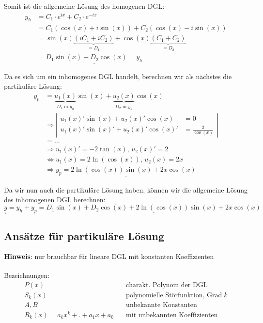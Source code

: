 Somit ist die allgemeine Lösung des homogenen DGL:
\begin{align*}
y_h &= C_1 \cdot e^{ix} + C_2 \cdot e^{-ix}\\
&= C_1 (\cos(x) + i\sin(x)) + C_2(\cos(x) - i\sin(x))\\
&= \sin(x) \underbrace{(i C_1 + i C_2)}_{ = D_1} + \cos(x) \underbrace{(C_1 + C_2)}_{= D_2}\\
&= \underline{D_1 \sin(x) + D_2 \cos(x) = y_h}
\end{align*}

Da es sich um ein inhomogenes DGL handelt, berechnen wir als nächstes die partikuläre
Lösung:
\begin{align*}
y_p &= \underbrace{u_1(x)}_{D_1 \text{ in } y_h} \sin(x) + \underbrace{u_2(x)}_{D_2 \text{ in } y_h} \cos(x)\\
&\Rightarrow \left|
	\begin{aligned}
		u_1(x)' \sin(x) + u_2(x)' \cos(x) &= 0\\
		u_1(x)' \sin(x)' + u_2(x)' \cos(x)' &= \frac{2}{\cos(x)}
	\end{aligned}
\right|\\
&= \ldots\\
&\Rightarrow u_1(x)' = -2 \tan(x),\, u_2(x)' = 2\\
&\Leftrightarrow u_1(x) = 2 \ln(\cos(x)),\, u_2(x) = 2x\\
&\Rightarrow \underline{y_p = 2 \ln(\cos(x)) \sin(x) + 2x \cos(x)}
\end{align*}

Da wir nun auch die partikuläre Lösung haben, können wir die allgemeine Lösung
des inhomogenen DGL berechnen:
$\underline{\underline{y}} = y_h + y_p = \underline{\underline{D_1 \sin(x) + D_2 \cos(x) + 2 \ln(\cos(x)) \sin(x) + 2x \cos(x)}}$

\subsection{Ansätze für partikuläre Lösung}
	\textbf{Hinweis}: nur brauchbar für lineare DGL mit konstanten Koeffizienten \\
	\\
	Bezeichnungen:
	\begin{align*}
	P(x)  &  \quad \text{charakt. Polynom der DGL}  \\
	S_k(x) & \quad \text{polynomielle Störfunktion, Grad} \; k \\
	A, B & \quad \text{unbekannte Konstanten} \\
	R_k(x) = a_k x^k + . + a_1 x + a_0 & \quad \text{mit unbekannten Koeffizienten}
	\end{align*}
	
